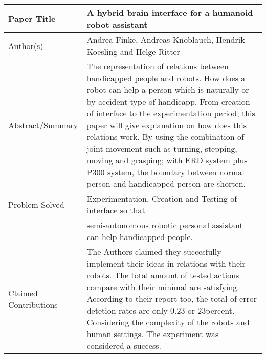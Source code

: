 \documentclass[a4paper, 12pt]{article}
\begin{document}
\setcounter{page}{1}

\begin{tabular}{| m{12em} | m{28em} |} 

\hline

Paper Title & A hybrid brain interface for a humanoid robot assistant \\
\hline

Author(s) & Andrea Finke, Andreas Knoblauch, Hendrik Koesling and Helge Ritter \\
\hline

Abstract/Summary & The representation of relations between handicapped people and robots. How does a robot can help a person which is naturally or by accident type of handicapp. From creation of interface to the experimentation period, this paper will give explanation on how does this relations work. By using the combination of joint movement such as turning, stepping, moving and grasping; with ERD system plus P300 system, the boundary between normal person and handicapped person are shorten. \\
\hline

Problem Solved 
& Experimentation, Creation and Testing of interface so that \\ 
& semi-autonomous robotic personal assistant can help handicapped people. \\
\hline

Claimed Contributions &
The Authors claimed they succesfully implement their ideas in relations with their robots. The total amount of tested actions compare with their minimal are satisfying. According to their report too, the total of error detetion rates are only 0.23 or 23percent. Considering the complexity of the robots and human settings. The experiment was considered a success.  \\
\hline


\end{tabular}
\end{document}
